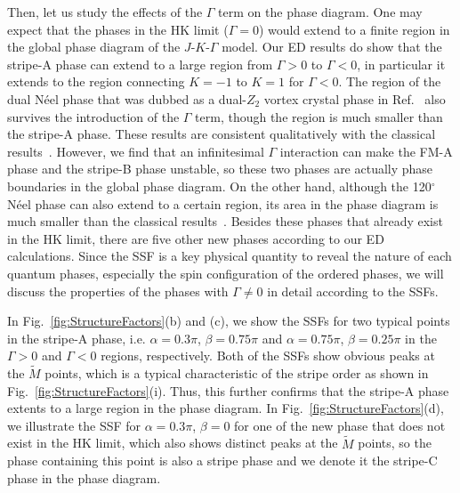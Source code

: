 \documentclass[aps,prb,reprint,amsfonts,amsmath,amssymb,showpacs,groupedaddress,superscriptaddress]{revtex4-1}
\begin{document}
Then, let us study the effects of the $\Gamma$ term on the phase diagram. One may expect that the phases in the HK limit ($\Gamma=0$) would extend to a finite region in the global phase diagram of the $J$-$K$-$\Gamma$ model. Our ED results do show that the stripe-A phase can extend to a large region from $\Gamma>0$ to $\Gamma<0$, in particular it extends to the region connecting $K=-1$ to $K=1$ for $\Gamma<0$. The region of the dual N\'{e}el phase that was dubbed as a dual-$Z_{2}$ vortex crystal phase in Ref.~ also survives
the introduction of the $\Gamma$ term, though the region is much smaller than the stripe-A phase. These results
are consistent qualitatively with the classical results~\cite{PhysRevB.92.165108}. However, we find that an infinitesimal $\Gamma$ interaction can make the FM-A phase and the stripe-B phase unstable, so these two phases are actually phase boundaries in the global phase diagram. On the other hand, although the 120$^\circ$ N\'{e}el phase can also extend to a certain region, its area in the phase diagram is much smaller than the classical results~\cite{PhysRevB.92.165108}. Besides these phases that already exist in the HK limit, there are five other new phases according to our ED calculations. Since the SSF is a key physical quantity to reveal the nature of each quantum phases, especially the spin configuration of the ordered phases, we will discuss the properties of the phases with $\Gamma\neq0$ in detail according to the SSFs.

In Fig.~\ref{fig:StructureFactors}(b) and (c), we show the SSFs for two typical points in the stripe-A phase, i.e. $\alpha=0.3\pi$, $\beta=0.75\pi$ and $\alpha=0.75\pi$, $\beta=0.25\pi$ in the $\Gamma>0$ and $\Gamma<0$ regions, respectively. Both of the SSFs show obvious peaks at the $\tilde{M}$ points, which is a typical characteristic of the stripe order as shown in Fig.~\ref{fig:StructureFactors}(i). Thus, this further confirms that the stripe-A phase extents to a large region in the phase diagram. In Fig.~\ref{fig:StructureFactors}(d), we illustrate the SSF for $\alpha=0.3\pi$, $\beta=0$ for one of the new phase that does not exist in the HK limit, which also shows distinct peaks at the $\tilde{M}$ points, so the phase containing this point is also a stripe phase and we denote it the stripe-C phase in the phase diagram.
\end{document}
